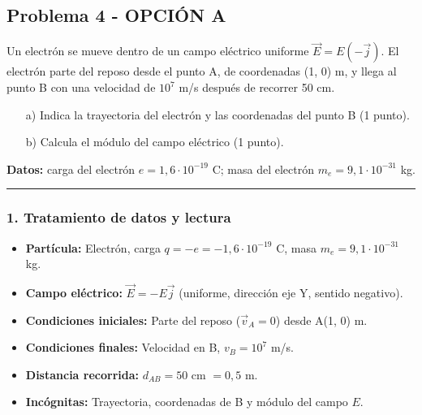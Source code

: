 \subsection{Problema 4 - OPCIÓN A}
\label{subsec:4A_2010_jun_ord}
\begin{cajaenunciado}
Un electrón se mueve dentro de un campo eléctrico uniforme $\vec{E}=E(-\vec{j})$. El electrón parte del reposo desde el punto A, de coordenadas (1, 0) m, y llega al punto B con una velocidad de $10^7$ m/s después de recorrer 50 cm.
\begin{enumerate}
    \item[a)] Indica la trayectoria del electrón y las coordenadas del punto B (1 punto).
    \item[b)] Calcula el módulo del campo eléctrico (1 punto).
\end{enumerate}
\textbf{Datos:} carga del electrón $e=1,6 \cdot 10^{-19}$ C; masa del electrón $m_e=9,1 \cdot 10^{-31}$ kg.
\end{cajaenunciado}
\hrule

\subsubsection*{1. Tratamiento de datos y lectura}
\begin{itemize}
    \item \textbf{Partícula:} Electrón, carga $q = -e = -1,6 \cdot 10^{-19}$ C, masa $m_e = 9,1 \cdot 10^{-31}$ kg.
    \item \textbf{Campo eléctrico:} $\vec{E} = -E\vec{j}$ (uniforme, dirección eje Y, sentido negativo).
    \item \textbf{Condiciones iniciales:} Parte del reposo ($\vec{v}_A = 0$) desde A(1, 0) m.
    \item \textbf{Condiciones finales:} Velocidad en B, $v_B = 10^7$ m/s.
    \item \textbf{Distancia recorrida:} $d_{AB} = 50$ cm $= 0,5$ m.
    \item \textbf{Incógnitas:} Trayectoria, coordenadas de B y módulo del campo $E$.
\end{itemize}

